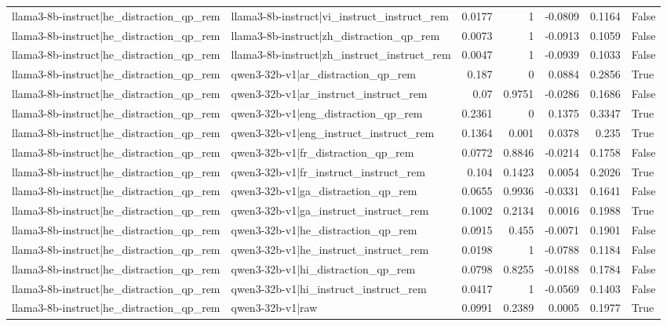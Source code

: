 \begin{table}
\begin{tabular}{l l r r r r l}
llama3-8b-instruct|he_distraction_qp_rem & llama3-8b-instruct|vi_instruct_instruct_rem & 0.0177 & 1 & -0.0809 & 0.1164 & False \\
llama3-8b-instruct|he_distraction_qp_rem & llama3-8b-instruct|zh_distraction_qp_rem & 0.0073 & 1 & -0.0913 & 0.1059 & False \\
llama3-8b-instruct|he_distraction_qp_rem & llama3-8b-instruct|zh_instruct_instruct_rem & 0.0047 & 1 & -0.0939 & 0.1033 & False \\
llama3-8b-instruct|he_distraction_qp_rem & qwen3-32b-v1|ar_distraction_qp_rem & 0.187 & 0 & 0.0884 & 0.2856 & True \\
llama3-8b-instruct|he_distraction_qp_rem & qwen3-32b-v1|ar_instruct_instruct_rem & 0.07 & 0.9751 & -0.0286 & 0.1686 & False \\
llama3-8b-instruct|he_distraction_qp_rem & qwen3-32b-v1|eng_distraction_qp_rem & 0.2361 & 0 & 0.1375 & 0.3347 & True \\
llama3-8b-instruct|he_distraction_qp_rem & qwen3-32b-v1|eng_instruct_instruct_rem & 0.1364 & 0.001 & 0.0378 & 0.235 & True \\
llama3-8b-instruct|he_distraction_qp_rem & qwen3-32b-v1|fr_distraction_qp_rem & 0.0772 & 0.8846 & -0.0214 & 0.1758 & False \\
llama3-8b-instruct|he_distraction_qp_rem & qwen3-32b-v1|fr_instruct_instruct_rem & 0.104 & 0.1423 & 0.0054 & 0.2026 & True \\
llama3-8b-instruct|he_distraction_qp_rem & qwen3-32b-v1|ga_distraction_qp_rem & 0.0655 & 0.9936 & -0.0331 & 0.1641 & False \\
llama3-8b-instruct|he_distraction_qp_rem & qwen3-32b-v1|ga_instruct_instruct_rem & 0.1002 & 0.2134 & 0.0016 & 0.1988 & True \\
llama3-8b-instruct|he_distraction_qp_rem & qwen3-32b-v1|he_distraction_qp_rem & 0.0915 & 0.455 & -0.0071 & 0.1901 & False \\
llama3-8b-instruct|he_distraction_qp_rem & qwen3-32b-v1|he_instruct_instruct_rem & 0.0198 & 1 & -0.0788 & 0.1184 & False \\
llama3-8b-instruct|he_distraction_qp_rem & qwen3-32b-v1|hi_distraction_qp_rem & 0.0798 & 0.8255 & -0.0188 & 0.1784 & False \\
llama3-8b-instruct|he_distraction_qp_rem & qwen3-32b-v1|hi_instruct_instruct_rem & 0.0417 & 1 & -0.0569 & 0.1403 & False \\
llama3-8b-instruct|he_distraction_qp_rem & qwen3-32b-v1|raw & 0.0991 & 0.2389 & 0.0005 & 0.1977 & True \\

\end{tabular}
\end{table}
